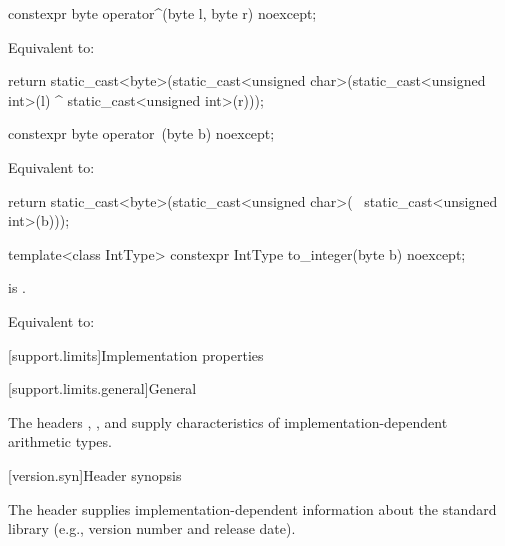 %
\begin{itemdecl}
constexpr byte operator^(byte l, byte r) noexcept;
\end{itemdecl}

\begin{itemdescr}
\pnum
\effects
Equivalent to:
\begin{codeblock}
return static_cast<byte>(static_cast<unsigned char>(static_cast<unsigned int>(l) ^
                                                    static_cast<unsigned int>(r)));
\end{codeblock}
\end{itemdescr}

%
\begin{itemdecl}
constexpr byte operator~(byte b) noexcept;
\end{itemdecl}

\begin{itemdescr}
\pnum
\effects
Equivalent to:
\begin{codeblock}
return static_cast<byte>(static_cast<unsigned char>(
	                   ~static_cast<unsigned int>(b)));
\end{codeblock}
\end{itemdescr}

%
\begin{itemdecl}
template<class IntType>
  constexpr IntType to_integer(byte b) noexcept;
\end{itemdecl}

\begin{itemdescr}
\pnum
\constraints
{} is .

\pnum
\effects
Equivalent to: 
\end{itemdescr}

[support.limits]{Implementation properties}

[support.limits.general]{General}

\pnum
The headers
,
, and
supply characteristics of
%
imple\-mentation-dependent
arithmetic types.

[version.syn]{Header  synopsis}

\pnum
The header 
supplies implementation-dependent information
about the \Cpp{} standard library
(e.g., version number and release date).

